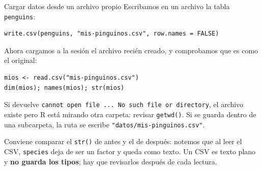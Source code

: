 \documentclass[aspectratio=169,10pt]{beamer}
\newcommand{\Rc}[1]{{\setlength{\fboxsep}{1.6pt}%
  \colorbox{codigoFondo}{\textcolor{codigoTexto}{\texttt{#1}}}}}
\newcommand{\destaca}[1]{%
  \par\vspace{3pt}\noindent
  \colorbox{azulClaro}{%
    \parbox{\dimexpr\linewidth-2\fboxsep\relax}{\vspace{3pt}#1\vspace{3pt}}}%
  \par\vspace{3pt}}
\begin{document}
\begin{frame}[fragile]{Cargar datos desde un archivo propio}
  Escribamos en un archivo la tabla \texttt{penguins}:
\begin{lstlisting}
write.csv(penguins, "mis-pinguinos.csv", row.names = FALSE)
\end{lstlisting}

\vspace{0.15cm}
Ahora cargamos a la sesión el archivo recién creado, y comprobamos que es como el original:
\begin{lstlisting}
mios <- read.csv("mis-pinguinos.csv")
dim(mios); names(mios); str(mios)
\end{lstlisting}

  \vspace{0.15cm}
  \destaca{\small Si devuelve \Rc{cannot open file ... No such file or directory},
  el archivo existe pero R está mirando otra carpeta: revisar \Rc{getwd()}. Si se
  guarda dentro de una subcarpeta, la ruta se escribe \Rc{"datos/mis-pinguinos.csv"}.

  \vspace{0.15cm}
  Conviene comparar el \Rc{str()} de antes y el de después: notemos que al leer el CSV, \texttt{species} deja de
  ser un factor y queda como texto. Un CSV es texto plano y \textbf{no guarda los
  tipos}; hay que revisarlos después de cada lectura.}
 
\end{frame}
\end{document}
